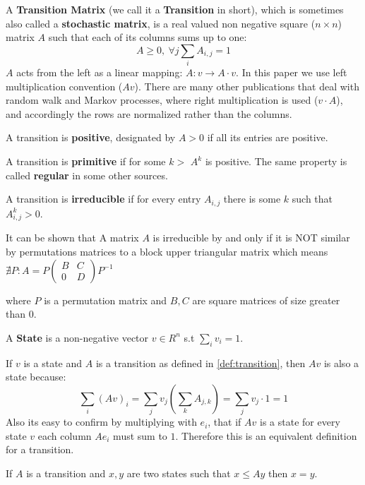 \begin{mydef}
\label{def:transition} A \textbf{Transition Matrix } (we call
it a \textbf{Transition} in short), which is sometimes also called a
\textbf{stochastic matrix}, is a real valued non negative square
($n \times n$) matrix $A$ such that each of its columns sums up to one: $$A
\geq 0,\ \forall j \sum_i A_{i,j} = 1$$ $A$ acts from the left as a
linear mapping: $A:v \to A \cdot v$. In this paper we use left
multiplication convention ($Av$). There are many other publications
that deal with random walk and Markov processes, where right
multiplication is used ($v \cdot A$), and accordingly the rows are
normalized rather than the columns.

A transition is \textbf{positive}, designated by $A > 0$ if all its entries are positive.

A transition is \textbf{primitive} if for some $k>$ $A^k$ is positive. The same
property is called \textbf{regular} in some other sources.

A transition is \textbf{irreducible} if for every entry $A_{i,j}$ there is some $k$ such
that $A^k_{i,j} > 0$.

It can be shown that 
A matrix $A$ is 
irreducible by and only if it is NOT
similar by permutations matrices to a block upper triangular matrix
which means 
$
\nexists P : 
A =
P
\begin{pmatrix}
B & C \\
0 & D
\end{pmatrix}
P^{-1}
$

where $P$ is a permutation matrix and $B, C$ are square matrices of size greater than $0$.
\end{mydef}

\begin{mydef}
\label{def:state}
A \textbf{State} is a non-negative vector $v \in R^n$ s.t $\sum_i v_i = 1$.
\end{mydef}

\begin{remark}
\label{remark:state}
If $v$ is a
state and $A$ is a transition as defined in
\ref{def:transition}, then
  $Av$ is also a state because: 
$$\sum_i(Av)_i = \sum_j v_j(\sum_k A_{j,k}) = \sum_j v_j \cdot 1 = 1$$
Also its easy to confirm by multiplying with $e_i$, that if $Av$ is a state
for every state $v$ 
each column $A e_i$ must sum to $1$.
Therefore this is an equivalent definition for a transition.

If $A$ is a transition and $x,y$ are two states such that
$x \leq Ay$ then $x=y$.
\end{remark}

